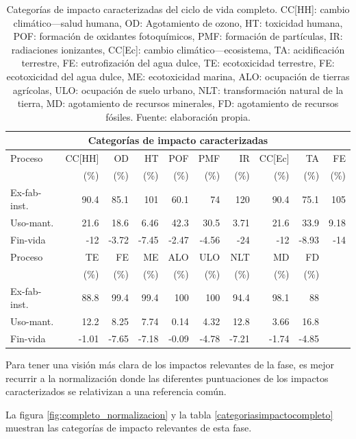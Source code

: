 \begin{table}[!htb]
\centering
\begin{tabular}{p{2cm}rrrrrrrrr}
\toprule
\multicolumn{10}{c}{Categorías de impacto caracterizadas}\\
\midrule
Proceso & CC[HH] & OD & HT & POF & PMF & IR & CC[Ec] & TA & FE\\
 &  (\%) & (\%) & (\%) & (\%) & (\%) & (\%) & (\%) & (\%) & (\%)\\
\midrule
Ex-fab-inst. & 90.4 & 85.1 & 101 & 60.1 & 74 & 120 & 90.4 & 75.1& 105\\
Uso-mant. & 21.6 & 18.6 & 6.46 & 42.3 & 30.5 & 3.71 & 21.6 & 33.9 & 9.18\\
Fin-vida & -12 & -3.72 & -7.45 & -2.47 & -4.56 & -24 & -12 & -8.93 & -14\\
\midrule
\midrule
Proceso & TE & FE & ME & ALO & ULO & NLT & MD & FD\\
 &  (\%) & (\%) & (\%) & (\%) & (\%) & (\%) & (\%) & (\%)\\
\midrule
Ex-fab-inst. & 88.8 & 99.4 & 99.4 & 100 & 100 & 94.4 & 98.1 & 88\\
Uso-mant. & 12.2 & 8.25 & 7.74 & 0.14 & 4.32 & 12.8 & 3.66 & 16.8\\
Fin-vida & -1.01 & -7.65 & -7.18 & -0.09 & -4.78 & -7.21 & -1.74 & -4.85\\
\bottomrule
\end{tabular}
\caption[Categorías de impacto caracterizadas del ciclo de vida completo.]{Categorías de impacto caracterizadas del ciclo de vida completo. CC[HH]: cambio climático—salud humana, OD: Agotamiento de ozono, HT: toxicidad humana, POF: formación de oxidantes fotoquímicos, PMF: formación de partículas, IR: radiaciones ionizantes, CC[Ec]: cambio climático—ecosistema, TA: acidificación terrestre, FE: eutrofización del agua dulce, TE: ecotoxicidad terrestre, FE: ecotoxicidad del agua dulce, ME: ecotoxicidad marina, ALO: ocupación de tierras agrícolas, ULO: ocupación de suelo urbano, NLT: transformación natural de la tierra, MD: agotamiento de recursos minerales, FD: agotamiento de recursos fósiles. Fuente: elaboración propia.}
\label{categoriasimpactocompletocaracterizados}
\end{table}

Para tener una visión más clara de los impactos relevantes de la fase, es mejor recurrir a la normalización donde las diferentes puntuaciones de los impactos caracterizados se relativizan a una referencia común.

La figura \ref{fig:completo_normalizacion} y la tabla \ref{categoriasimpactocompleto} muestran las categorías de impacto relevantes de esta fase.

